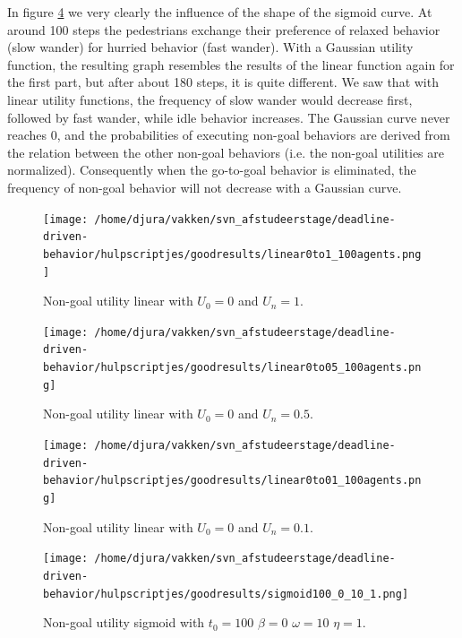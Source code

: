 \documentclass[11pt, a4paper]{book}
\begin{document}
In figure \ref{fig:sigmoid100_0_10_1} we very clearly the influence of the shape of the sigmoid curve. At around 100 steps the pedestrians exchange their preference of relaxed behavior (slow wander) for hurried behavior (fast wander). With a Gaussian utility function, the resulting graph resembles the results of the linear function again for the first part, but after about 180 steps, it is quite different. We saw that with linear utility functions, the frequency of slow wander would decrease first, followed by fast wander, while idle behavior increases. The Gaussian curve never reaches 0, and the probabilities of executing non-goal behaviors are derived from the relation between the other non-goal behaviors (i.e. the non-goal utilities are normalized). Consequently when the go-to-goal behavior is eliminated, the frequency of non-goal behavior will not decrease with a Gaussian curve.

\begin{figure}
\centering
\texttt{[image: /home/djura/vakken/svn\_afstudeerstage/deadline-driven-behavior/hulpscriptjes/goodresults/linear0to1\_100agents.png]}
\caption{Non-goal utility linear with $U_0=0$ and $U_n=1$.}
\label{fig:linear0to1_100agents}
\end{figure}


\begin{figure}
\centering
\texttt{[image: /home/djura/vakken/svn\_afstudeerstage/deadline-driven-behavior/hulpscriptjes/goodresults/linear0to05\_100agents.png]}
\caption{Non-goal utility linear with $U_0 = 0$ and $U_n=0.5$.}
\label{fig:linear0to0.5_100agents}
\end{figure}

\begin{figure}
\centering
\texttt{[image: /home/djura/vakken/svn\_afstudeerstage/deadline-driven-behavior/hulpscriptjes/goodresults/linear0to01\_100agents.png]}
\caption{Non-goal utility linear with $U_0=0$ and $U_n=0.1$.}
\label{fig:linear0to01_100agents}
\end{figure}

\begin{figure}
\centering
\texttt{[image: /home/djura/vakken/svn\_afstudeerstage/deadline-driven-behavior/hulpscriptjes/goodresults/sigmoid100\_0\_10\_1.png]}
\caption{Non-goal utility sigmoid with $t_0=100$ $\beta=0$ $\omega=10$ $\eta=1$.}
\label{fig:sigmoid100_0_10_1}
\end{figure}
\end{document}

